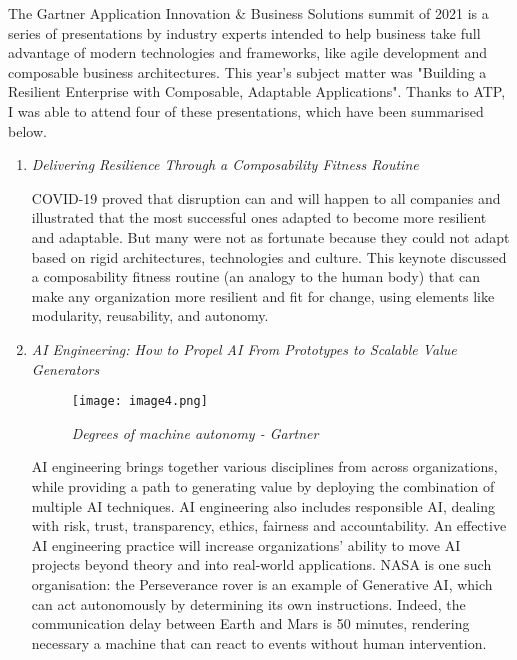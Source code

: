 The Gartner Application Innovation \& Business Solutions summit of 2021 is a series of presentations by industry experts intended to help business take full advantage of modern technologies and frameworks, like agile development and composable business architectures. This year's subject matter was "Building a Resilient Enterprise with Composable, Adaptable Applications". Thanks to ATP, I was able to attend four of these presentations, which have been summarised below.

\begin{enumerate}
    \item \color{dgreen} \textit{Delivering Resilience Through a Composability Fitness Routine}
    
    \color{black}COVID-19 proved that disruption can and will happen to all companies and illustrated that the most successful ones adapted to become more resilient and adaptable. But many were not as fortunate because they could not adapt based on rigid architectures, technologies and culture. This keynote discussed a composability fitness routine (an analogy to the human body) that can make any organization more resilient and fit for change, using elements like modularity, reusability, and autonomy.

    \item \color{dgreen} \textit{AI Engineering: How to Propel AI From Prototypes to Scalable Value Generators}
    
    \begin{figure}[H]
        \centering
            \texttt{[image: image4.png]}
            \caption*{\textit{Degrees of machine autonomy - Gartner}}
    \end{figure}

    \color{black} AI engineering brings together various disciplines from across organizations, while providing a path to generating value by deploying the combination of multiple AI techniques. AI engineering also includes responsible AI, dealing with risk, trust, transparency, ethics, fairness and accountability. An effective AI engineering practice will increase organizations’ ability to move AI projects beyond theory and into real-world applications. NASA is one such organisation: the Perseverance rover is an example of Generative AI, which can act  autonomously by determining its own instructions. Indeed, the communication delay between Earth and Mars is 50 minutes, rendering necessary a machine that can react to events without human intervention.


\end{enumerate}
